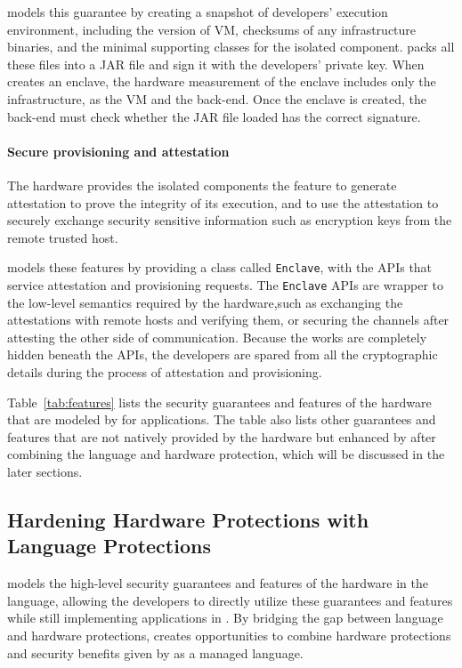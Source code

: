 \sysname{} models this guarantee by creating a snapshot of developers'
execution environment, including the version of \java{} VM,
checksums of any infrastructure binaries,
and the minimal supporting classes for the isolated component. 
\sysname{} packs all these files into a JAR file and sign it with the developers' private key.
When \sysname{} creates an enclave, the hardware measurement of the enclave includes only the infrastructure, as the \java{} VM and the \sysname{} back-end.
Once the enclave is created, the \sysname{} back-end must  
check whether the JAR file loaded has the correct signature.

\paragraph{Secure provisioning and attestation}
The \sgx{} hardware provides the isolated components the feature to generate attestation to prove the integrity of its execution,
and to use the attestation to securely exchange
security sensitive information such as encryption keys from the remote trusted host.

\sysname{} models these features by providing a class called {\tt Enclave}, with the APIs that service attestation and provisioning requests.
The {\tt Enclave} APIs are wrapper to the low-level semantics required by the \sgx{} hardware,such as exchanging the attestations with remote hosts and verifying them, or 
securing the channels after attesting the other side of communication.
Because the works are completely hidden beneath the APIs,
the developers are spared from all the cryptographic details during the process of attestation and provisioning.

\vspace{0.15in}
Table~\ref{tab:features} lists the security guarantees and features of
the \sgx{} hardware
that are modeled by \sysname{} for \java{} applications.
The table also lists other guarantees and features
that are not natively provided by the \sgx{} hardware
but enhanced by \sysname{} after combining the language and hardware protection, which will be discussed in the later sections.  

\subsection{Hardening Hardware Protections with Language Protections}

\sysname{} models the high-level security guarantees and features
of the \sgx{} hardware in the \java{} language,
allowing the developers to directly utilize these guarantees and features
while still implementing applications in \java{}.
By bridging the gap between language and hardware protections,
\sysname{} creates opportunities to combine \sgx{} hardware protections
and security benefits given by \java{} as a managed language.

